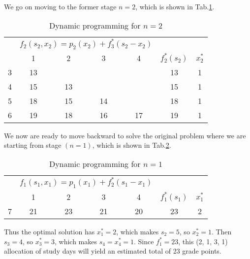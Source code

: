 \documentclass[a4paper]{article}
\begin{document}
\begin{enumerate}
\begin{solution}
  	We go on moving to the former stage $n=2$, which is shown in Tab.\ref{tabn2}.
  	\begin{table}[H]
	  	\centering
	  	\caption{Dynamic programming for $n=2$}
	  	\label{tabn2}
	  	\begin{tabular}{ccccccc}
	  		\toprule[1.5pt]
	  		&\multicolumn{4}{c}{$f_2(s_2,x_2)=p_2(x_2)+f_3^*(s_2-x_2)$}&\\
	  		\cmidrule{2-5}
	  		\diagbox[width=3em]{$s_2$}{$x_2$}&\hspace*{0.4cm}1\hspace*{0.4cm}&\hspace*{0.4cm}2\hspace*{0.4cm}&\hspace*{0.4cm}3\hspace*{0.4cm}&\hspace*{0.4cm}4\hspace*{0.3cm}&$f_2^*(s_2)$&$x_2^*$\\
	  		\midrule
			3&13&&&&13&1\\
			4&15&13&&&15&1\\
			5&18&15&14&&18&1\\
			6&19&18&16&17&19&1\\
	  		\bottomrule[1.5pt]
	  	\end{tabular}
  	\end{table}
  	We now are ready to move backward to solve the original problem where we are starting from stage $(n=1)$, which is shown in Tab.\ref{tabn1}.
  	\begin{table}[H]
	  	\centering
	  	\caption{Dynamic programming for $n=1$}
	  	\label{tabn1}
	  	\begin{tabular}{ccccccc}
	  		\toprule[1.5pt]
	  		~&\multicolumn{4}{c}{$f_1(s_1,x_1)=p_1(x_1)+f_2^*(s_1-x_1)$}&\\
	  		\cmidrule{2-5}
	  		\diagbox[width=3em]{$s_1$}{$x_1$}&\hspace*{0.4cm}1\hspace*{0.4cm}&\hspace*{0.4cm}2\hspace*{0.4cm}&\hspace*{0.4cm}3\hspace*{0.4cm}&\hspace*{0.4cm}4\hspace*{0.4cm}&$f_1^*(s_1)$&$x_1^*$\\
	  		\midrule
			7&21&23&21&20&23&2\\
	  		\bottomrule[1.5pt]
	  	\end{tabular}
  	\end{table}
  	Thus the optimal solution has $x_1^*=2$, which makes $s_2=5$, so $x_2^*=1$. Then $s_3=4$, so $x_3^*=3$, which makes $s_4=x_4^*=1$. Since $f_1^*=23$, this (2, 1, 3, 1) allocation of study days will yield an estimated total of 23 grade points.
\end{solution}


\end{enumerate}
\end{document}
